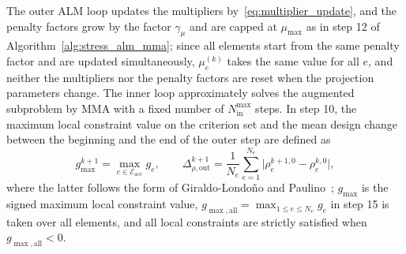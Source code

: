 The outer ALM loop updates the multipliers by~\eqref{eq:multiplier_update}, and the penalty factors grow by the factor $\gamma_\mu$ and are capped at $\mu_{\max}$ as in step 12 of Algorithm~\ref{alg:stress_alm_mma}; since all elements start from the same penalty factor and are updated simultaneously, $\mu_e^{(k)}$ takes the same value for all $e$, and neither the multipliers nor the penalty factors are reset when the projection parameters change. The inner loop approximately solves the augmented subproblem by MMA with a fixed number of $N_{\mathrm{in}}^{\max}$ steps. In step 10, the maximum local constraint value on the criterion set and the mean design change between the beginning and the end of the outer step are defined as
\begin{equation*}
g_{\max}^{k+1} = \max_{e \in \mathcal{E}_{\mathrm{acc}}} g_e,
\qquad
\Delta_{\rho,\mathrm{out}}^{k+1} = \frac{1}{N_e} \sum_{e=1}^{N_e} \bigl| \rho_e^{k+1,0} - \rho_e^{k,0} \bigr|,
\end{equation*}
where the latter follows the form of Giraldo-Londoño and Paulino~\cite{GiraldoLondono2021}; $g_{\max}$ is the signed maximum local constraint value, $g_{\max,\mathrm{all}} = \max_{1 \le e \le N_e} g_e$ in step 15 is taken over all elements, and all local constraints are strictly satisfied when $g_{\max,\mathrm{all}} < 0$.

